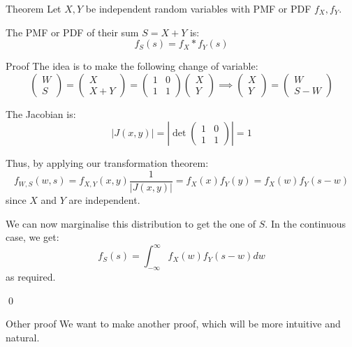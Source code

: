 \documentclass[a4paper]{article}
\begin{document}
\begin{parag}{Theorem}
    Let $X, Y$ be independent random variables with PMF or PDF $f_X, f_Y$.

    The PMF or PDF of their sum $S = X + Y$ is: 
    \[f_S\left(s\right) = f_X * f_Y\left(s\right)\]
    
    \begin{subparag}{Proof}
        The idea is to make the following change of variable: 
        \[\begin{pmatrix} W \\ S \end{pmatrix} = \begin{pmatrix} X \\ X + Y \end{pmatrix} = \begin{pmatrix} 1 & 0 \\ 1 & 1 \end{pmatrix} \begin{pmatrix} X \\ Y \end{pmatrix} \implies \begin{pmatrix} X \\ Y \end{pmatrix} = \begin{pmatrix} W \\ S - W \end{pmatrix} \]
        
        The Jacobian is: 
        \[\left|J\left(x, y\right)\right| = \left|\det \begin{pmatrix} 1 & 0 \\ 1 & 1 \end{pmatrix} \right| = 1\]
        
        Thus, by applying our transformation theorem: 
        \[f_{W, S}\left(w, s\right) = f_{X, Y}\left(x, y\right) \frac{1}{\left|J\left(x, y\right)\right|} = f_{X}\left(x\right)f_Y\left(y\right) = f_X\left(w\right)f_Y\left(s-w\right)\]
        since $X$ and $Y$ are independent.

        We can now marginalise this distribution to get the one of $S$. In the continuous case, we get: 
        \[f_S\left(s\right) = \int_{-\infty}^{\infty} f_X\left(w\right)f_Y\left(s-w\right)dw\]
        as required.

        \qed
    \end{subparag}

    \begin{subparag}{Other proof}
        We want to make another proof, which will be more intuitive and natural.


\end{subparag}
\end{parag}
\end{document}
